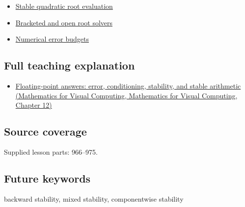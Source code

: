 \begin{itemize}
\tightlist
\item
  \hyperref[appendix-b9afba7f63e5]{Stable quadratic root evaluation}
\item
  \hyperref[appendix-f63eb850796d]{Bracketed and open root solvers}
\item
  \hyperref[appendix-31b8c295e05f]{Numerical error budgets}
\end{itemize}

\subsection{Full teaching explanation}\label{appendix-aa2bf0d79639-full-teaching-explanation}

\begin{itemize}
\tightlist
\item
  \href{../02-Mathematics-for-Visual-Computing/main.pdf\#nameddest=02-foundations-ii-ch028-floating-point-answers-error-conditioning-stability-and-stable-arithmetic}{Floating-point answers: error, conditioning, stability, and stable arithmetic (Mathematics for Visual Computing, Mathematics for Visual Computing, Chapter 12)}
\end{itemize}

\subsection{Source coverage}\label{appendix-aa2bf0d79639-source-coverage}

Supplied lesson parts: 966--975.

\subsection{Future keywords}\label{appendix-aa2bf0d79639-future-keywords}

backward stability, mixed stability, componentwise stability
